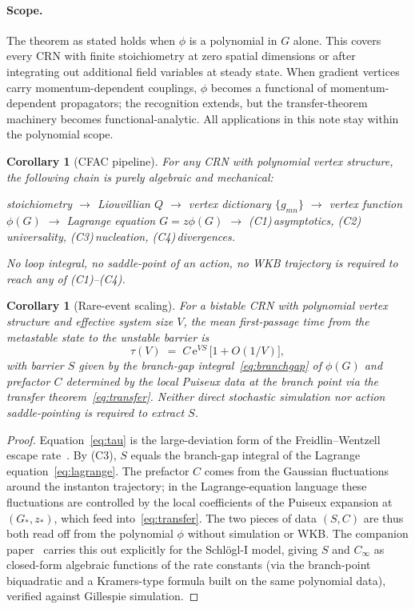 \documentclass[11pt,a4paper]{article}
\newcommand{\ee}{\mathrm{e}}
\theoremstyle{plain}
\newtheorem{corollary}[theorem]{Corollary}
\theoremstyle{definition}
\begin{document}
\paragraph{Scope.}
The theorem as stated holds when $\phi$ is a polynomial in $G$
alone.  This covers every CRN with finite stoichiometry at zero
spatial dimensions or after integrating out additional field
variables at steady state.  When gradient vertices carry
momentum-dependent couplings, $\phi$ becomes a functional of
momentum-dependent propagators; the recognition extends, but the
transfer-theorem machinery becomes functional-analytic.  All
applications in this note stay within the polynomial scope.

\begin{corollary}[CFAC pipeline]
\label{cor:pipeline}
For any CRN with polynomial vertex structure, the following chain
is purely algebraic and mechanical:
\begin{center}
\small
stoichiometry $\to$ Liouvillian $Q$
$\to$ vertex dictionary $\{g_{m n}\}$
$\to$ vertex function $\phi(G)$
$\to$ Lagrange equation $G = z\phi(G)$
$\to$ (C1)\,asymptotics, (C2)\,universality, (C3)\,nucleation, (C4)\,divergences.
\end{center}
No loop integral, no saddle-point of an action, no WKB trajectory
is required to reach any of (C1)--(C4).
\end{corollary}

\begin{corollary}[Rare-event scaling]
\label{cor:rare}
For a bistable CRN with polynomial vertex structure and effective
system size $V$, the mean first-passage time from the metastable
state to the unstable barrier is
\begin{equation}\label{eq:tau}
  \tau(V) \;=\; C\,\ee^{V S} \,\bigl[1 + O(1/V)\bigr],
\end{equation}
with barrier $S$ given by the branch-gap
integral~\eqref{eq:branchgap} of $\phi(G)$ and prefactor $C$
determined by the local Puiseux data at the branch point via the
transfer theorem~\eqref{eq:transfer}.  Neither direct stochastic
simulation nor action saddle-pointing is required to extract $S$.
\end{corollary}

\begin{proof}[Proof]
Equation~\eqref{eq:tau} is the large-deviation form of the
Freidlin--Wentzell escape rate~\citep{FreidlinWentzell}.  By
(C3), $S$ equals the branch-gap integral of the Lagrange
equation~\eqref{eq:lagrange}.  The prefactor $C$ comes from the
Gaussian fluctuations around the instanton trajectory; in the
Lagrange-equation language these fluctuations are controlled by
the local coefficients of the Puiseux expansion at $(G_*, z_*)$,
which feed into~\eqref{eq:transfer}.  The two pieces of data
$(S, C)$ are thus both read off from the polynomial $\phi$
without simulation or WKB.  The companion paper~\citep{CFACpaper}
carries this out explicitly for the Schl\"ogl-I model, giving
$S$ and $C_\infty$ as closed-form algebraic functions of the
rate constants (via the branch-point biquadratic and a
Kramers-type formula built on the same polynomial data), verified
against Gillespie simulation.
\end{proof}
\end{document}
